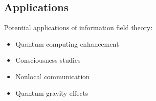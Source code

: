 \subsection{Applications}

Potential applications of information field theory:

\begin{itemize}
    \item Quantum computing enhancement
    \item Consciousness studies
    \item Nonlocal communication
    \item Quantum gravity effects
\end{itemize} 